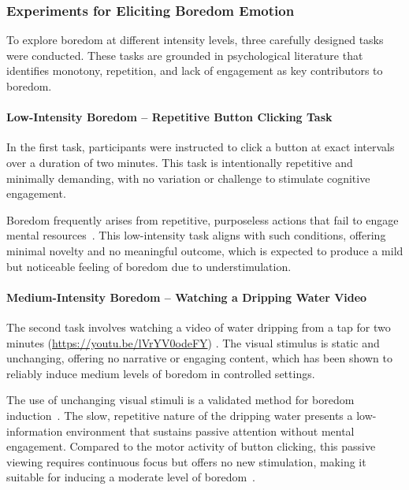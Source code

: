 \subsubsection{Experiments for Eliciting Boredom Emotion}

To explore boredom at different intensity levels, three carefully designed tasks were conducted. These tasks are grounded in psychological literature that identifies monotony, repetition, and lack of engagement as key contributors to boredom.

\paragraph*{Low-Intensity Boredom – Repetitive Button Clicking Task}

In the first task, participants were instructed to click a button at exact intervals over a duration of two minutes. This task is intentionally repetitive and minimally demanding, with no variation or challenge to stimulate cognitive engagement.

Boredom frequently arises from repetitive, purposeless actions that fail to engage mental resources~\citep{bench2013function}. This low-intensity task aligns with such conditions, offering minimal novelty and no meaningful outcome, which is expected to produce a mild but noticeable feeling of boredom due to understimulation.

\paragraph*{Medium-Intensity Boredom – Watching a Dripping Water Video}

The second task involves watching a video of water dripping from a tap for two minutes (\url{https://youtu.be/lVrYV0odeFY}) \citep{atomic_filmmaker_boring_video}. The visual stimulus is static and unchanging, offering no narrative or engaging content, which has been shown to reliably induce medium levels of boredom in controlled settings.

The use of unchanging visual stimuli is a validated method for boredom induction~\citep{markey2014identifying}. The slow, repetitive nature of the dripping water presents a low-information environment that sustains passive attention without mental engagement. Compared to the motor activity of button clicking, this passive viewing requires continuous focus but offers no new stimulation, making it suitable for inducing a moderate level of boredom~\citep{bench2013function}.

